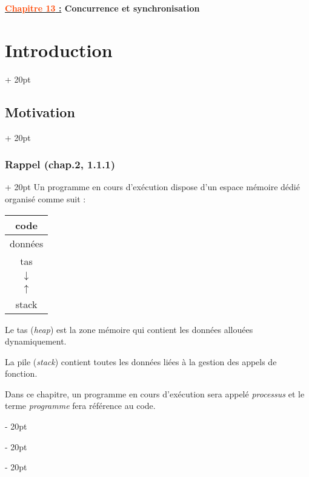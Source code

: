 \documentclass[a4paper, 12pt, twoside]{article}
\newcommand{\Emph}{\textcolor{ff4500}}
\newcommand{\ind}[1][20pt]{\advance\leftskip + #1}
\newcommand{\deind}[1][20pt]{\advance\leftskip - #1}
\newenvironment{indt}[2][20pt]{#2 \par \ind[#1]}{\par \deind} %
\newcommand{\thetitle}[2]{\begin{center}\textbf{{\LARGE \underline{\Emph{#1} :}} {\Large #2}}\end{center}}
\begin{document}
    
    
    \thetitle{Chapitre 13}{Concurrence et synchronisation}
    
    \tableofcontents
    \newpage
    
    
    \begin{indt}{\section{Introduction}}
        \begin{indt}{\subsection{Motivation}}
            \begin{indt}{\subsubsection{Rappel (chap.2, 1.1.1)}}
                Un programme en cours d'exécution dispose d'un espace mémoire dédié organisé comme suit :

                \begin{center}
                    \begin{tabular}{|c|}
                        \hline
                        code
                        \\
                        \hline
                        données
                        \\
                        \hline
                        tas
                        \\
                        $\downarrow$
                        \\
                        \hline
                        $\uparrow$
                        \\
                        stack
                        \\
                        \hline
                    \end{tabular}
                \end{center}

                Le tas (\textit{heap}) est la zone mémoire qui contient les données allouées dynamiquement.

                La pile (\textit{stack}) contient toutes les données liées à la gestion des appels de fonction.

                Dans ce chapitre, un programme en cours d'exécution sera appelé \textit{processus} et le terme \textit{programme} fera référence au code.
            \end{indt}


\end{indt}
\end{indt}
\end{document}
